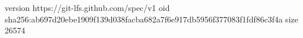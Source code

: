 version https://git-lfs.github.com/spec/v1
oid sha256:ab697d20ebe1909f139d038facba682a7f6e917db5956f377083f1fdf86c3f4a
size 26574
